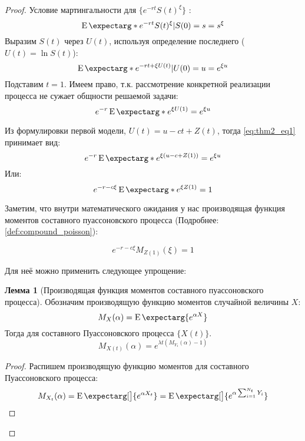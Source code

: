 \documentclass[a4paper,12pt]{article}
\theoremstyle{definition}
\newtheorem{lemma}{Лемма}
\newcommand{\expect}{\operatorname{E}\expectarg}
\begin{document}
\begin{proof}
Условие мартингальности для $\{e^{-rt} S(t)^{\xi}\}$ :
\begin{equation*}
\expect*{e^{-rt} S(t)^{\xi}|S(0) = s} = s^{\xi}
\end{equation*}
Выразим $S(t)$ через $U(t)$, используя определение последнего ($U(t) = \ln{S(t)}$):
\begin{equation*}
\expect*{e^{-rt + \xi U(t)}|U(0) = u} = e^{\xi u}
\end{equation*}
Подставим $t = 1$. Имеем право, т.к. рассмотрение конкретной реализации процесса не сужает общности решаемой задачи:
\begin{equation}\label{eq:thm2_eq1}
e^{-r}\expect*{e^{\xi U(1)}} = e^{\xi u}
\end{equation}

Из формулировки первой модели, $U(t) = u - ct + Z(t)$, тогда \eqref{eq:thm2_eq1} принимает вид:
\begin{equation*}
e^{-r}\expect*{e^{\xi(u - c + Z(1))}} = e^{\xi u}
\end{equation*}
Или:
\begin{equation*}
e^{-r - c \xi} \expect*{e^{\xi Z(1)}} = 1
\end{equation*}

Заметим, что внутри математического ожидания у нас производящая функция моментов составного пуассоновского процесса (Подробнее: \ref{def:compound_poisson}):

\begin{equation}\label{eq:thm2_eq2}
e^{-r - c \xi} M_{Z(1)}(\xi) = 1
\end{equation}

Для неё можно применить следующее упрощение:

\begin{lemma}[Производящая функция моментов составного пуассоновского процесса]\label{thm:thm2_moment_generating_function}
Обозначим производящую функцию моментов случайной величины $X$:
\begin{equation*}
    M_X(\alpha) = \expect{e^{\alpha X}}
\end{equation*}
Тогда для составного Пуассоновского процесса $\{X(t)\}$.
\begin{equation}\label{eq:moment_generating_for_poisson}
     M_{X(t)}(\alpha) = e^{\lambda t \left(M_{Y_1}(\alpha) - 1\right)}
\end{equation}
\end{lemma}
\begin{proof}
Распишем производящую функцию моментов для составного Пуассоновского процесса:
\begin{equation*}
     M_{X_t}(\alpha) = \expect[\big]{e^{\alpha X_t}} = \expect[\big]{e^{\alpha \sum_{i=1}^{N_t} Y_i}}
\end{equation*}


\end{proof}
\end{proof}
\end{document}
